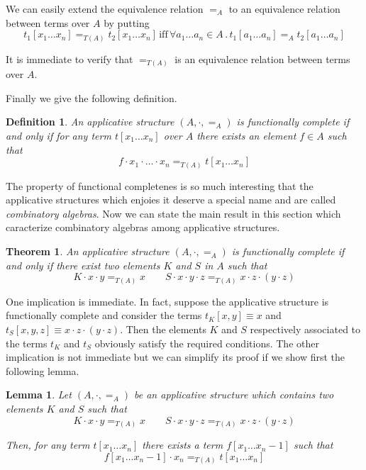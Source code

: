 \documentclass[a4paper,10pt]{article}
\newtheorem{definition}{Definition}
\newtheorem{theorem}{Theorem}
\newtheorem{lemma}{Lemma}
\begin{document}
We can easily extend the equivalence relation $=_A$ to an equivalence relation
between terms over $A$ by putting
$$t_1[x_1 \dots x_n] =_{T(A)} t_2[x_1 \dots x_n] \, \text{iff} \, \forall a_1
\dots a_n \in A \,.\, t_1[a_1 \dots a_n] =_A t_2[a_1 \dots a_n]$$

It is immediate to verify that $=_{T(A)}$ is an equivalence relation between
terms over $A$.

Finally we give the following definition.

\begin{definition}
 An applicative structure $(A, \cdot, =_A)$ is \emph{functionally complete} if
and only if for any term $t[x_1 \dots x_n]$ over $A$ there exists an element
$f \in A$ such that
$$f \cdot x_1 \cdot \dots \cdot x_n =_{T(A)} t[x_1 \dots x_n]$$
\end{definition}

The property of functional completenes is so much interesting that the
applicative structures which enjoies it deserve a special name and are called
\emph{combinatory algebras}. Now we can state the main result in this section
which caracterize combinatory algebras among applicative structures.

\begin{theorem}
 An applicative structure $(A, \cdot, =_A)$ is functionally complete if and
only if there exist two elements $K$ and $S$ in $A$ such that
$$K \cdot x \cdot y =_{T(A)} x \hspace{2em} S \cdot x \cdot y \cdot z =_{T(A)}x
\cdot z \cdot (y \cdot z)$$
\end{theorem}

One implication is immediate. In fact, suppose the applicative structure is
functionally complete and consider the terms $t_K[x,y] \equiv x$ and
$t_S[x,y,z] \equiv x \cdot z \cdot (y \cdot z)$. Then the elements $K$ and $S$
respectively associated to the terms $t_K$ and $t_S$ obviously satisfy the
required conditions. The other implication is not immediate but we can simplify
its proof if we show first the following lemma.

\begin{lemma}\label{lemma1}
Let $(A, \cdot, =_A)$ be an applicative structure which contains two elements
$K$ and $S$ such that
$$K \cdot x \cdot y =_{T(A)} x \hspace{2em} S \cdot x \cdot y \cdot z =_{T(A)}x
\cdot z \cdot (y \cdot z)$$

Then, for any term $t[x_1 \dots x_n]$ there exists a term $f[x_1 \dots x_n-1]$
such that
$$f[x_1 \dots x_n-1] \cdot x_n =_{T(A)} t[x_1 \dots x_n]$$
\end{lemma}
\end{document}
